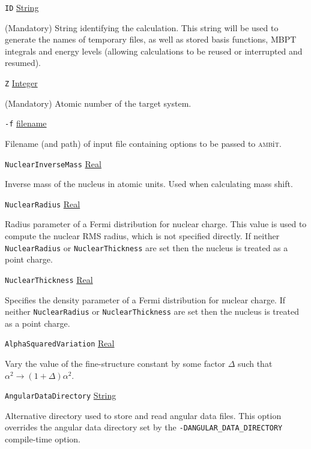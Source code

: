 \documentclass{report}
\newcommand{\ambit}{\textsc{amb}{\footnotesize i}\textsc{t}}
\begin{document}
\texttt{ID} \uline{String}
\begin{adjustwidth}{1cm}{}
(Mandatory) String identifying the calculation. This string will be used to generate the names of 
temporary files, as well as stored basis functions, MBPT integrals and energy levels 
(allowing calculations to be reused or interrupted and resumed).
\end{adjustwidth}

\texttt{Z} \uline{Integer}
\begin{adjustwidth}{1cm}{}
(Mandatory) Atomic number of the target system. 
\end{adjustwidth}

\texttt{-f} \uline{filename}
\begin{adjustwidth}{1cm}{}
Filename (and path) of input file containing options to be passed to \ambit. 
\end{adjustwidth}

\texttt{NuclearInverseMass} \uline{Real}
\begin{adjustwidth}{1cm}{}
Inverse mass of the nucleus in atomic units. Used when calculating mass shift.
\end{adjustwidth}

\texttt{NuclearRadius} \uline{Real}
\begin{adjustwidth}{1cm}{}
Radius parameter of a Fermi distribution for nuclear charge. This value is 
used to compute the nuclear RMS radius, which is not specified directly. If neither 
\texttt{NuclearRadius} or \texttt{NuclearThickness} are set then the nucleus is treated as a point 
charge.
\end{adjustwidth}

\texttt{NuclearThickness} \uline{Real}
\begin{adjustwidth}{1cm}{}
Specifies the density parameter of a Fermi distribution for nuclear charge. 
If neither \texttt{NuclearRadius} or \texttt{NuclearThickness} are set then the nucleus is treated as a 
point charge.
\end{adjustwidth}

\texttt{AlphaSquaredVariation} \uline{Real}
\begin{adjustwidth}{1cm}{}
Vary the value of the fine-structure constant by some factor $\Delta$ such that 
$\alpha^2 \to (1 + \Delta)\alpha^2$. 
\end{adjustwidth}

\texttt{AngularDataDirectory} \uline{String}
\begin{adjustwidth}{1cm}{}
Alternative directory used to store and read angular data files. This option overrides the angular data
directory set by the \texttt{-DANGULAR\_DATA\_DIRECTORY} compile-time option.
\end{adjustwidth}
\end{document}
